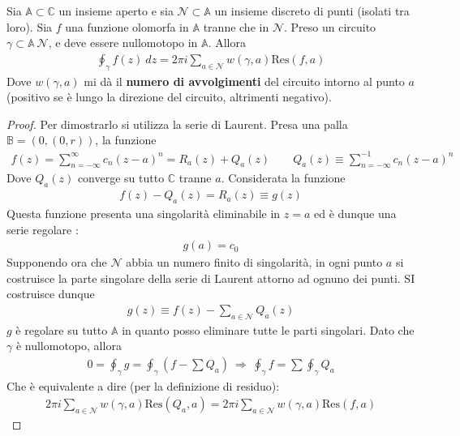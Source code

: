 \documentclass[a4paper, oneside]{article}
\begin{document}
\begin{theorem}
    Sia $\mathbb{A} \subset \mathbb{C}$ un insieme aperto e sia $\mathcal{N} \subset \mathbb{A}$ un insieme 
    discreto di punti (isolati tra loro). Sia $f$ una funzione olomorfa in $\mathbb{A}$ tranne che in $\mathcal{N}$.
    Preso un circuito $\gamma \subset \mathbb{A} \ \mathcal{N}$, e deve essere nullomotopo in $\mathbb{A}$. Allora
    \begin{align}
        \oint _{\gamma} f(z) \ dz = 2\pi i\sum_{a\in \mathcal{N}} w(\gamma, a) \text{Res}(f, a) 
    \end{align}
    Dove $w(\gamma, a)$ mi dà il \textbf{numero di avvolgimenti} del circuito intorno al punto $a$ (positivo se è lungo la direzione 
    del circuito, altrimenti negativo). 
\end{theorem}
\begin{proof}
    Per dimostrarlo si utilizza la serie di Laurent. Presa una palla
    $\mathbb{B} = (0, (0, r))$, la funzione 
    \begin{gather*}
        f(z) = \sum_{n = -\infty }^{\infty } c_n(z - a)^{n} = R_a(z) + Q_a(z) \qquad Q_a(z) \equiv \sum_{n = -\infty } ^{-1} c_n(z - a)^{n}
    \end{gather*}
    Dove $Q_a(z)$ converge su tutto $\mathbb{C}$ tranne $a$. Considerata la funzione 
    \begin{gather*}
        f(z) - Q_a(z) = R_a(z) \equiv g(z)
    \end{gather*}
    Questa funzione presenta una singolarità eliminabile in $z = a$ ed è dunque una serie regolare :
    \begin{gather*}
        g(a) = c_0  
    \end{gather*}
    Supponendo ora che $\mathcal{N}$ abbia un numero finito di singolarità, in ogni punto $a$
    si costruisce la parte singolare della serie di Laurent attorno ad ognuno dei punti. SI costruisce dunque 
    \begin{gather*}
        g(z) \equiv f(z) - \sum_{a \in \mathcal{N}} Q_a(z) 
    \end{gather*}
    $g$ è regolare su tutto $\mathbb{A}$ in quanto posso eliminare tutte le parti singolari. 
    Dato che $\gamma$ è nullomotopo, allora 
    \begin{gather*}
        0 = \oint_\gamma g = \oint _\gamma (f - \sum Q_a ) \ \Longrightarrow \ \oint_\gamma f = \sum \oint_\gamma Q_a
    \end{gather*}
    Che è equivalente a dire (per la definizione di residuo):
    \begin{gather*}
        2\pi i \sum_{a \in \mathcal{N} } w(\gamma, a) \text{Res}(Q_a, a) = 2\pi i \sum_{a \in \mathcal{N}} w(\gamma, a) \text{Res}(f, a) 
    \end{gather*}
\end{proof}
\end{document}
